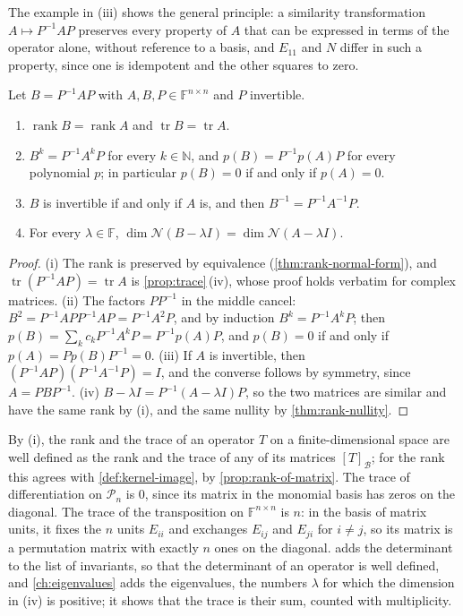 The example in (iii) shows the general principle: a similarity transformation $A\mapsto P^{-1}AP$ preserves every property of $A$ that can be expressed in terms of the operator alone, without reference to a basis, and $E_{11}$ and $N$ differ in such a property, since one is idempotent and the other squares to zero.

\begin{proposition}
\label{prop:similarity-invariants}
Let $B=P^{-1}AP$ with $A,B,P\in\mathbb F^{n\times n}$ and $P$ invertible.
\begin{enumerate}
\item $\operatorname{rank}B=\operatorname{rank}A$ and $\operatorname{tr}B=\operatorname{tr}A$.
\item $B^k=P^{-1}A^kP$ for every $k\in\mathbb N$, and $p(B)=P^{-1}p(A)P$ for every polynomial $p$; in particular $p(B)=0$ if and only if $p(A)=0$.
\item $B$ is invertible if and only if $A$ is, and then $B^{-1}=P^{-1}A^{-1}P$.
\item For every $\lambda\in\mathbb F$, $\dim\mathcal N(B-\lambda I)=\dim\mathcal N(A-\lambda I)$.
\end{enumerate}
\end{proposition}

\begin{proof}
(i) The rank is preserved by equivalence (\cref{thm:rank-normal-form}), and $\operatorname{tr}(P^{-1}AP)=\operatorname{tr}A$ is \cref{prop:trace}\,(iv), whose proof holds verbatim for complex matrices. (ii) The factors $PP^{-1}$ in the middle cancel: $B^2=P^{-1}APP^{-1}AP=P^{-1}A^2P$, and by induction $B^k=P^{-1}A^kP$; then $p(B)=\sum_kc_kP^{-1}A^kP=P^{-1}p(A)P$, and $p(B)=0$ if and only if $p(A)=Pp(B)P^{-1}=0$. (iii) If $A$ is invertible, then $(P^{-1}AP)(P^{-1}A^{-1}P)=I$, and the converse follows by symmetry, since $A=PBP^{-1}$. (iv) $B-\lambda I=P^{-1}(A-\lambda I)P$, so the two matrices are similar and have the same rank by (i), and the same nullity by \cref{thm:rank-nullity}.
\end{proof}

By (i), the rank and the trace of an operator $T$ on a finite-dimensional space are well defined as the rank and the trace of any of its matrices $[T]_{\mathcal B}$; for the rank this agrees with \cref{def:kernel-image}, by \cref{prop:rank-of-matrix}. The trace of differentiation on $\mathcal P_n$ is $0$, since its matrix in the monomial basis has zeros on the diagonal. The trace of the transposition on $\mathbb F^{n\times n}$ is $n$: in the basis of matrix units, it fixes the $n$ units $E_{ii}$ and exchanges $E_{ij}$ and $E_{ji}$ for $i\ne j$, so its matrix is a permutation matrix with exactly $n$ ones on the diagonal.  adds the determinant to the list of invariants, so that the determinant of an operator is well defined, and \cref{ch:eigenvalues} adds the eigenvalues, the numbers $\lambda$ for which the dimension in (iv) is positive; it shows that the trace is their sum, counted with multiplicity.

